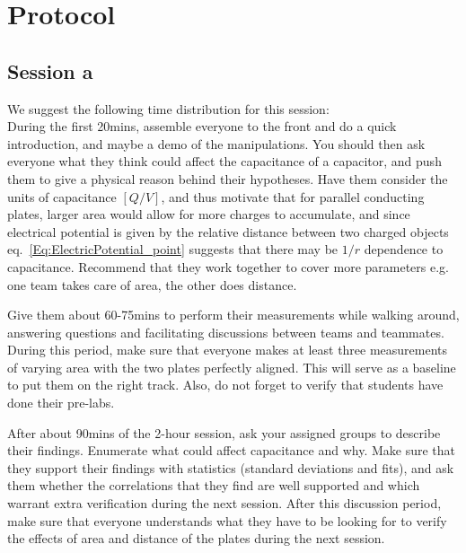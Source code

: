 \documentclass[12pt]{report}
\begin{document}

\section{Protocol}
\subsection{Session a}
\begin{tcolorbox}[title=Session \#1]
We suggest the following time distribution for this session:\\

During the first 20mins, assemble everyone to the front and do a quick introduction, and maybe a  demo of the manipulations. You should then ask everyone what they think could affect the capacitance of a capacitor, and push them to give a physical reason behind their hypotheses. Have them consider the units of capacitance $[Q/V]$, and thus motivate that for parallel conducting plates, larger area would allow for more charges to accumulate, and since electrical potential is given by the relative distance between two charged objects eq.~\eqref{Eq:ElectricPotential_point} suggests that there may be $1/r$ dependence to capacitance. Recommend that they work together to cover more parameters e.g. one team takes care of area, the other does distance.
\end{tcolorbox}

\begin{tcolorbox}
Give them about 60-75mins to perform their measurements while walking around, answering questions and facilitating discussions between teams and teammates. During this period, make sure that everyone makes at least three measurements of varying area with the two plates perfectly aligned. This will serve as a baseline to put them on the right track. Also, do not forget to verify that students have done their pre-labs.
\end{tcolorbox}

\begin{tcolorbox}
After about 90mins of the 2-hour session, ask your assigned groups to describe their findings. Enumerate what could affect capacitance and why. Make sure that they support their findings with statistics (standard deviations and fits), and ask them whether the correlations that they find are well supported and which warrant extra verification during the next session. After this discussion period, make sure that everyone understands what they have to be looking for to verify the effects of area and distance of the plates during the next session.
\end{tcolorbox}
\end{document}
